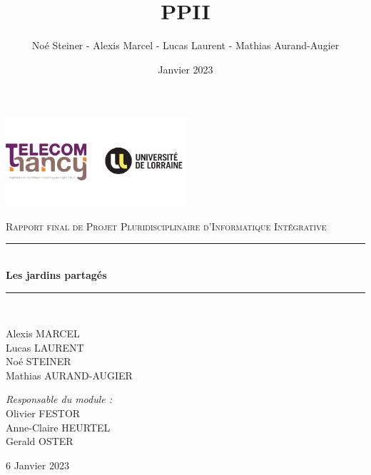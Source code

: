 \documentclass[french,a4paper]{article}
\title{PPII}
\author{Noé Steiner - Alexis Marcel - Lucas Laurent - Mathias Aurand-Augier}
\date{Janvier 2023}
\newcommand{\HRule}{\rule{\linewidth}{0.5mm}}
\begin{document}

\begin{titlepage}
    \begin{center}

        \includegraphics[width=0.5\textwidth]{tele_univ.png}

        \textsc{\Large Rapport final de Projet Pluridisciplinaire d'Informatique Intégrative}\\[1.5cm]

        \HRule \\[0.4cm]
        { \huge \bfseries Les jardins partagés\\[0.4cm] }

        \HRule \\[2cm]

        \begin{minipage}{0.4\textwidth}
            \begin{flushleft} \large
                Alexis MARCEL\\
                Lucas LAURENT\\
                Noé STEINER\\
                Mathias AURAND-AUGIER\\
            \end{flushleft}
        \end{minipage}
        \begin{minipage}{0.4\textwidth}
            \begin{flushright} \large
                \emph{Responsable du module :}\\
                Olivier FESTOR\\
                Anne-Claire HEURTEL\\
                Gerald OSTER\\
            \end{flushright}
        \end{minipage}

        \vfill

        {\large 6 Janvier 2023}

    \end{center}
\end{titlepage}
\newpage
\tableofcontents
\newpage
\end{document}
